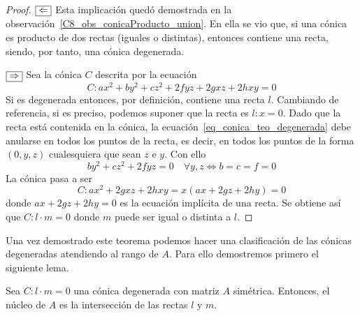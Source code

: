 \begin{proof}
	$\fbox{$\Leftarrow$}$ Esta implicación quedó demostrada en la observación~\ref{C8_obs_conicaProducto_union}. En ella se vio que, si una cónica es producto de dos rectas (iguales o distintas), entonces contiene una recta, siendo, por tanto, una cónica degenerada.
	
	$\fbox{$\Rightarrow$}$ Sea la cónica $C$ descrita por la ecuación
	\begin{equation}\label{eq_conica_teo_degenerada}
	C: ax^2+by^2+cz^2+2fyz+2gxz+2hxy=0
	\end{equation}
	Si es degenerada entonces, por definición, contiene una recta $l$. Cambiando de referencia, si es preciso, podemos suponer que la recta es $l:x=0$. Dado que la recta está contenida en la cónica, la ecuación~\eqref{eq_conica_teo_degenerada} debe anularse en todos los puntos de la recta, es decir, en todos los puntos de la forma $(0,y,z)$ cualesquiera que sean $z$ e $y$. Con ello
	\begin{equation}
	by^2+cz^2+2fyz=0 \quad \forall y,z \Leftrightarrow b=c=f=0
	\end{equation}
	La cónica pasa a ser
	\begin{equation}
	C: ax^2+2gxz+2hxy=x(ax+2gz+2hy)=0
	\end{equation}
	donde $ax+2gz+2hy=0$ es la ecuación implícita de una recta. Se obtiene así que $C:l\cdot m=0$ donde $m$ puede ser igual o distinta a $l$.
\end{proof}

Una vez demostrado este teorema podemos hacer una clasificación de las cónicas degeneradas atendiendo al rango de $A$. Para ello demostremos primero el siguiente lema.

\begin{lem}\label{C8_lem_nucleo_interseccion_rectas}
	Sea $C:l\cdot m=0$ una cónica degenerada con matriz $A$ simétrica. Entonces, el núcleo de $A$ es la intersección de las rectas $l$ y $m$.
\end{lem}


